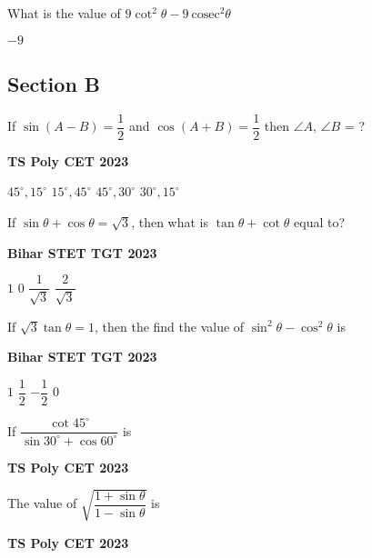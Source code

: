 \documentclass[11pt,paper=a4,answers]{exam}
\begin{document}
\begin{multicols}{2}
\begin{questions}
\begin{choices}
\end{choices}
\question What is the value of $9 \cot^2 \theta -9\ \textrm{cosec}^2 \theta$


\begin{choices}
\choice $-9$
\end{choices}
\subsection*{Section B}
\question If $\displaystyle \sin \left(A-B \right) = \dfrac{1}{2}$ and $\displaystyle \cos \left( A+B \right) = \dfrac{1}{2}$ then $\angle A$, $\angle B$ = ?

\begin{flushright}
\small\textbf{TS Poly CET 2023}
\end{flushright}


\begin{choices}
\choice $\displaystyle 45^{\circ}, 15^{\circ}$ 
\choice $\displaystyle 15^{\circ}, 45^{\circ}$ 
\choice $\displaystyle 45^{\circ}, 30^{\circ}$ 
\choice $\displaystyle 30^{\circ}, 15^{\circ}$ 
\end{choices}

\columnbreak
\question If $\sin \theta + \cos \theta = \sqrt{3}$, then what is  $\tan \theta + \cot \theta$ equal to?
\begin{flushright}
\small\textbf{Bihar STET TGT 2023}
\end{flushright}


\begin{choices}
\choice $\displaystyle 1$ 
\choice $\displaystyle 0$  
\choice $\displaystyle \dfrac{1}{\sqrt{3}}$  
\choice $\displaystyle \dfrac{2}{\sqrt{3}}$  
\end{choices}


\question If $\sqrt{3} \tan  \theta = 1$, then the find the value of $\sin^2 \theta  - \cos^2 \theta$ is
\begin{flushright}
\small\textbf{Bihar STET TGT 2023}
\end{flushright}


\begin{choices}
\choice $\displaystyle 1$ 
\choice $\displaystyle \dfrac{1}{2}$ 
\choice $\displaystyle - \dfrac{1}{2}$ 
\choice $\displaystyle 0$ 
\end{choices}

\question 
If $\displaystyle \dfrac{ \cot 45^{\circ} }{\sin 30^{\circ} + \cos 60^{\circ} } $ is
\begin{flushright}
\small\textbf{TS Poly CET 2023}
\end{flushright}
\begin{choices}
\end{choices}
\question The value of $\displaystyle \sqrt{\dfrac{1+ \sin \theta}{1-\sin \theta}}   $ is
\begin{flushright}
\small\textbf{TS Poly CET 2023}
\end{flushright}



\end{questions}
\end{multicols}
\end{document}
